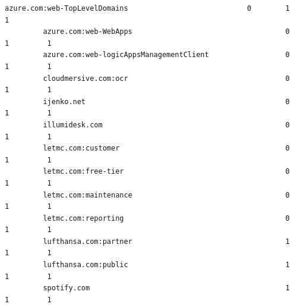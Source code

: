 \documentclass[11pt]{article}
\begin{document}
\begin{Verbatim}[commandchars=\\\{\}]
         azure.com:web-TopLevelDomains                            0        1         1   
         azure.com:web-WebApps                                    0        1         1   
         azure.com:web-logicAppsManagementClient                  0        1         1   
         cloudmersive.com:ocr                                     0        1         1   
         ijenko.net                                               0        1         1   
         illumidesk.com                                           0        1         1   
         letmc.com:customer                                       0        1         1   
         letmc.com:free-tier                                      0        1         1   
         letmc.com:maintenance                                    0        1         1   
         letmc.com:reporting                                      0        1         1   
         lufthansa.com:partner                                    1        1         1   
         lufthansa.com:public                                     1        1         1   
         spotify.com                                              1        1         1   
         

\end{Verbatim}
\end{document}
